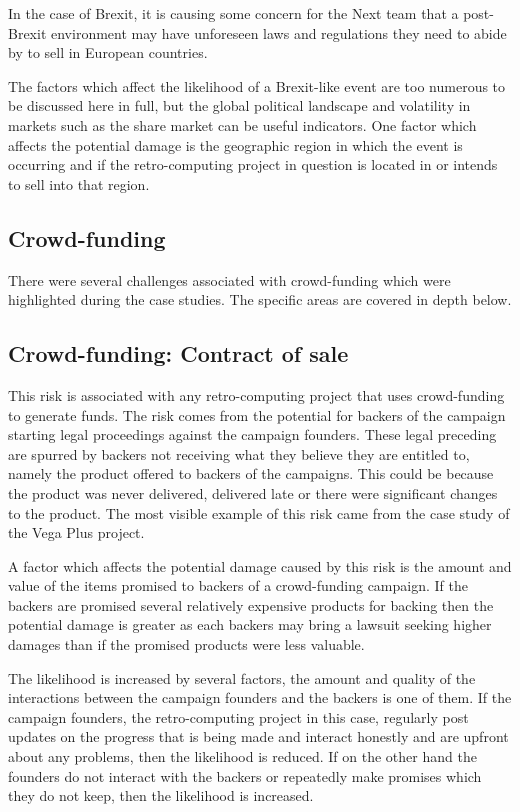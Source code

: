 In the case of Brexit, it is causing some concern for the Next team that a post-Brexit environment may have unforeseen laws and regulations they need to abide by to sell in European countries. 

The factors which affect the likelihood of a Brexit-like event are too numerous to be discussed here in full, but the global political landscape and volatility in markets such as the share market can be useful indicators. One factor which affects the potential damage is the geographic region in which the event is occurring and if the retro-computing project in question is located in or intends to sell into that region.

\subsection{Crowd-funding}
There were several challenges associated with crowd-funding which were highlighted during the case studies. The specific areas are covered in depth below. 

\subsection{Crowd-funding: Contract of sale}
This risk is associated with any retro-computing project that uses crowd-funding to generate funds. The risk comes from the potential for backers of the campaign starting legal proceedings against the campaign founders. These legal preceding are spurred by backers not receiving what they believe they are entitled to, namely the product offered to backers of the campaigns. This could be because the product was never delivered, delivered late or there were significant changes to the product. The most visible example of this risk came from the case study of the Vega Plus project.  

A factor which affects the potential damage caused by this risk is the amount and value of the items promised to backers of a crowd-funding campaign. If the backers are promised several relatively expensive products for backing then the potential damage is greater as each backers may bring a lawsuit seeking higher damages than if the promised products were less valuable. 

The likelihood is increased by several factors, the amount and quality of the interactions between the campaign founders and the backers is one of them. If the campaign founders, the retro-computing project in this case, regularly post updates on the progress that is being made and interact honestly and are upfront about any problems, then the likelihood is reduced. If on the other hand the founders do not interact with the backers or repeatedly make promises which they do not keep, then the likelihood is increased.

